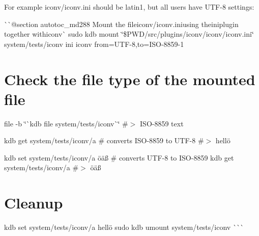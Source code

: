 For example {\ttfamily iconv/iconv.\+ini} should be {\ttfamily latin1}, but all users have {\ttfamily U\+T\+F-\/8} settings\+:

\`{}\`{}{\ttfamily  @section autotoc\+\_\+md288 Mount the file}iconv/iconv.\+ini{\ttfamily using the}ini{\ttfamily plugin together with}iconv\`{} sudo kdb mount \char`\"{}\$\+P\+W\+D/src/plugins/iconv/iconv/iconv.\+ini\char`\"{} system/tests/iconv ini iconv from=U\+T\+F-\/8,to=I\+S\+O-\/8859-\/1\hypertarget{autotoc_md285_autotoc_md289}{}\section{Check the file type of the mounted file}\label{autotoc_md285_autotoc_md289}
file -\/b \char`\"{}\`{}kdb file system/tests/iconv\`{}\char`\"{} \#$>$ I\+S\+O-\/8859 text

kdb get system/tests/iconv/a \# converts I\+S\+O-\/8859 to U\+T\+F-\/8 \#$>$ hellö

kdb set system/tests/iconv/a öäß \# converts U\+T\+F-\/8 to I\+S\+O-\/8859 kdb get system/tests/iconv/a \#$>$ öäß\hypertarget{autotoc_md285_autotoc_md290}{}\section{Cleanup}\label{autotoc_md285_autotoc_md290}
kdb set system/tests/iconv/a hellö sudo kdb umount system/tests/iconv \`{}\`{}\`{} 